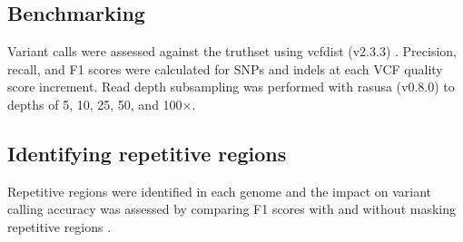 \documentclass[11pt]{article}
\begin{document}
\subsection{Benchmarking}

Variant calls were assessed against the truthset using vcfdist (v2.3.3) \citep{dunn2023}. Precision, recall, and F1 scores were calculated for SNPs and indels at each VCF quality score increment. Read depth subsampling was performed with rasusa (v0.8.0) \citep{hall2022} to depths of 5, 10, 25, 50, and 100$\times$.

\subsection{Identifying repetitive regions}

Repetitive regions were identified in each genome and the impact on variant calling accuracy was assessed by comparing F1 scores with and without masking repetitive regions \citep{treangen2012}.



\end{document}
